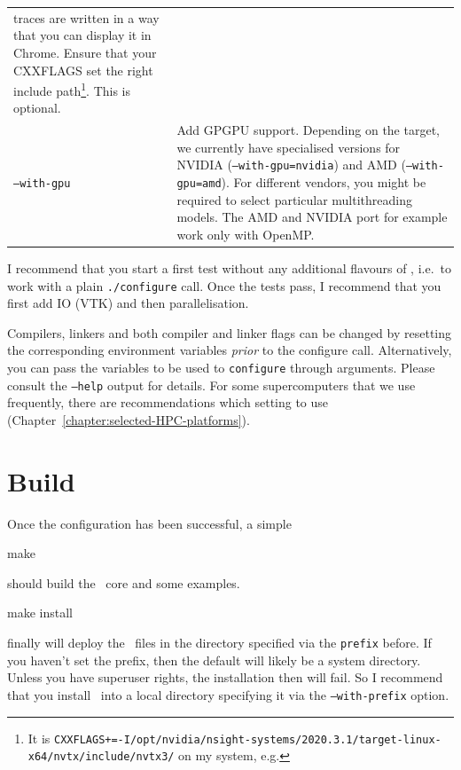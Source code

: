 \begin{center}
\begin{tabular}{lp{10cm}}
  traces are written in a way that you can display it in Chrome. Ensure that your CXXFLAGS set the right include path\footnote{It is
  \texttt{CXXFLAGS+=-I/opt/nvidia/nsight-systems/2020.3.1/target-linux-x64/nvtx/include/nvtx3/}
  on my system, e.g.}.
  This is optional.
   \\
  \texttt{--with-gpu} & Add GPGPU support. Depending on the target, we currently
  have specialised versions for NVIDIA (\texttt{--with-gpu=nvidia}) and AMD
  (\texttt{--with-gpu=amd}). For different vendors, you might be required to
  select particular multithreading models. The AMD and NVIDIA port for example
  work only with OpenMP.  
 \end{tabular}
\end{center}


\begin{remark}
 I recommend that you start a first test without any additional flavours of
 \Peano, i.e.~to work with a plain \texttt{./configure} call. Once the tests
 pass, I recommend that you first add IO (VTK) and then parallelisation.
\end{remark}


\noindent
Compilers, linkers and both compiler and linker flags can be changed by
resetting the corresponding environment variables \emph{prior} to the configure
call.
Alternatively, you can pass the variables to be used to \texttt{configure}
through arguments. 
Please consult the \texttt{--help} output for details.
For some supercomputers that we use frequently, there are recommendations which
setting to use (Chapter~\ref{chapter:selected-HPC-platforms}).



\section{Build}

Once the configuration has been successful, a simple 
\begin{code}
make
\end{code}
should build the \Peano\ core and some examples.


\begin{code}
make install
\end{code}
finally will deploy the \Peano\ files in the directory specified via the
\texttt{prefix} before.
If you haven't set the prefix, then the default will likely be a system
directory.
Unless you have superuser rights, the installation then will fail.
So I recommend that you install \Peano\ into a local directory specifying it via
the \texttt{--with-prefix} option.


